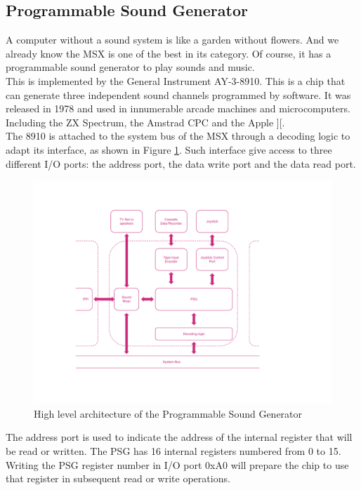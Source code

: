 \subsection{Programmable Sound Generator}

A computer without a sound system is like a garden without flowers. And we already know the MSX is one of the best in its category. Of course, it has a programmable sound generator to play sounds and music. \\

This is implemented by the General Instrument AY-3-8910. This is a chip that can generate three independent sound channels programmed by software. It was released in 1978 and used in innumerable arcade machines and microcomputers. Including the ZX Spectrum, the Amstrad CPC and the Apple ][. \\

The 8910 is attached to the system bus of the MSX through a decoding logic to adapt its interface, as shown in Figure \ref{fig:msx-arch-psg}. Such interface give access to three different I/O ports: the address port, the data write port and the data read port. \\

\begin{figure}
	\centering
	\includegraphics[width=1\linewidth,trim={0cm 80 0 50}]{images/figures/msx-arch-psg}
	\caption{High level architecture of the Programmable Sound Generator}
	\label{fig:msx-arch-psg}
\end{figure}

The address port is used to indicate the address of the internal register that will be read or written. The PSG has 16 internal registers numbered from 0 to 15. Writing the PSG register number in I/O port 0xA0 will prepare the chip to use that register in subsequent read or write operations.\\

